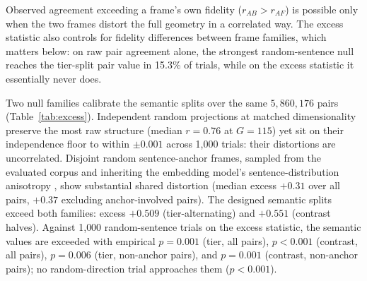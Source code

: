 \documentclass[11pt]{article}
\begin{document}
Observed agreement exceeding a frame's own fidelity ($r_{AB}>r_{AF}$) is possible only when the two frames distort the full geometry in a correlated way. The excess statistic also controls for fidelity differences between frame families, which matters below: on raw pair agreement alone, the strongest random-sentence null reaches the tier-split pair value in 15.3\% of trials, while on the excess statistic it essentially never does.

Two null families calibrate the semantic splits over the same $5{,}860{,}176$ pairs (Table~\ref{tab:excess}). Independent random projections at matched dimensionality preserve the most raw structure (median $r=0.76$ at $G=115$) yet sit on their independence floor to within $\pm0.001$ across 1{,}000 trials: their distortions are uncorrelated. Disjoint random sentence-anchor frames, sampled from the evaluated corpus and inheriting the embedding model's sentence-distribution anisotropy \citep{ethayarajh2019contextual}, show substantial shared distortion (median excess $+0.31$ over all pairs, $+0.37$ excluding anchor-involved pairs). The designed semantic splits exceed both families: excess $+0.509$ (tier-alternating) and $+0.551$ (contrast halves). Against 1{,}000 random-sentence trials on the excess statistic, the semantic values are exceeded with empirical $p=0.001$ (tier, all pairs), $p<0.001$ (contrast, all pairs), $p=0.006$ (tier, non-anchor pairs), and $p=0.001$ (contrast, non-anchor pairs); no random-direction trial approaches them ($p<0.001$).
\end{document}
